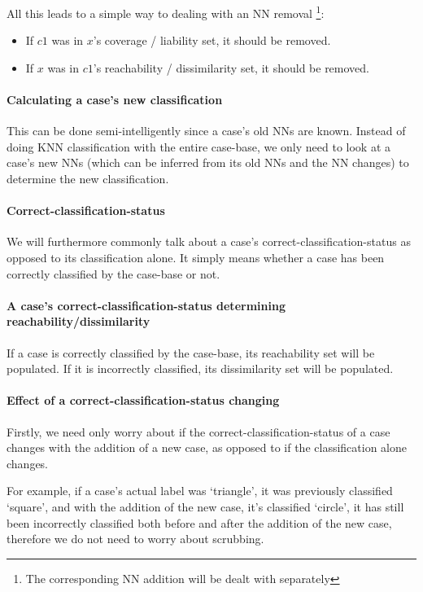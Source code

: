 \documentclass[a4paper,11pt]{report}
\begin{document}
All this leads to a simple way to dealing with an NN removal \footnote{The corresponding NN addition will be dealt with separately}:
\begin{itemize}
	\item If $c1$ was in $x$'s coverage / liability set, it should be removed.
	\item If $x$ was in $c1$'s reachability / dissimilarity set, it should be removed.
\end{itemize}

\paragraph{Calculating a case's new classification}
This can be done semi-intelligently since a case's old NNs are known. Instead of doing KNN classification with the entire case-base, we only need to look at a case's new NNs (which can be inferred from its old NNs and the NN changes) to determine the new classification.

\paragraph{Correct-classification-status}
We will furthermore commonly talk about a case's correct-classification-status as opposed to its classification alone. It simply means whether a case has been correctly classified by the case-base or not. 

\paragraph{A case's correct-classification-status determining reachability/dissimilarity}
If a case is correctly classified by the case-base, its reachability set will be populated. If it is incorrectly classified, its dissimilarity set will be populated.
 
\paragraph{Effect of a correct-classification-status changing}
Firstly, we need only worry about if the correct-classification-status of a case changes with the addition of a new case, as opposed to if the classification alone changes.

For example, if a case's actual label was `triangle', it was previously classified `square', and with the addition of the new case, it's classified `circle', it has still been incorrectly classified both before and after the addition of the new case, therefore we do not need to worry about scrubbing.
\end{document}
